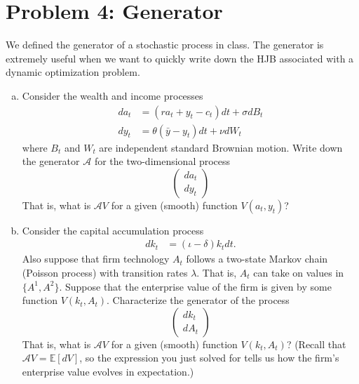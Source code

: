 \documentclass[11pt]{extarticle}
\theoremstyle{plain}
\theoremstyle{definition}
\begin{document}
\vspace{5mm}
\section*{Problem 4: Generator}

We defined the generator of a stochastic process in class. The generator is extremely useful when we want to quickly write down the HJB associated with a dynamic optimization problem. 

\vspace{4mm}
\begin{enumerate}[(a)]
\item Consider the wealth and income processes 
\begin{align*}
	da_t &= (ra_t + y_t - c_t)dt + \sigma dB_t \\
	dy_t &= \theta (\bar y - y_t) dt + \nu dW_t
\end{align*}
where $B_t$ and $W_t$ are independent standard Brownian motion. Write down the generator $\mathcal A$ for the two-dimensional process
\begin{equation*}
	\begin{pmatrix}
		d a_t \\
		d y_t 
	\end{pmatrix}
\end{equation*}
That is, what is $\mathcal A V$ for a given (smooth) function $V(a_t, y_t)$?

\item Consider the capital accumulation process
\begin{align*}
	dk_t &= (\iota - \delta) k_t dt. 
\end{align*}
Also suppose that firm technology $A_t$ follows a two-state Markov chain (Poisson process) with transition rates $\lambda$. That is, $A_t$ can take on values in $\{A^1, A^2\}$. Suppose that the enterprise value of the firm is given by some function $V(k_t, A_t)$. Characterize the generator of the process
\begin{equation*}
	\begin{pmatrix}
		d k_t \\
		d A_t 
	\end{pmatrix}
\end{equation*}
That is, what is $\mathcal A V$ for a given (smooth) function $V(k_t, A_t)$? (Recall that $\mathcal A V = \mathbb E[d V]$, so the expression you just solved for tells us how the firm's enterprise value evolves in expectation.)

\end{enumerate}
\end{document}
